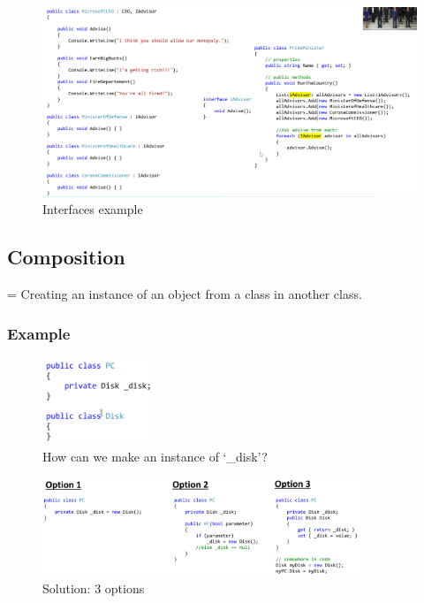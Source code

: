 \documentclass{article}
\begin{document}
\begin{figure}[H]
    \centering
    \includegraphics[width=\textwidth]{interfaces.png}
    \caption{Interfaces example}
\end{figure}

\subsection{Composition}

= Creating an instance of an object from a class in another class.

\subsubsection{Example}

\begin{figure}[H]
    \centering
    \includegraphics[width=0.3\textwidth]{composition1.png}
    \caption{How can we make an instance of `\_disk'?}
\end{figure}

\begin{figure}[H]
    \centering
    \includegraphics[width=0.85\textwidth]{composition2.png}
    \caption{Solution: 3 options}
\end{figure}
\end{document}
